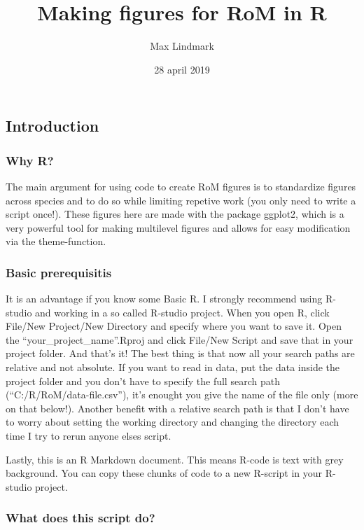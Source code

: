\documentclass[]{article}
\title{Making figures for RoM in R}
\author{Max Lindmark}
\date{28 april 2019}
\begin{document}
\maketitle

\subsection{Introduction}\label{introduction}

\subsubsection{Why R?}\label{why-r}

The main argument for using code to create RoM figures is to standardize
figures across species and to do so while limiting repetive work (you
only need to write a script once!). These figures here are made with the
package ggplot2, which is a very powerful tool for making multilevel
figures and allows for easy modification via the theme-function.

\subsubsection{Basic prerequisitis}\label{basic-prerequisitis}

It is an advantage if you know some Basic R. I strongly recommend using
R-studio and working in a so called R-studio project. When you open R,
click File/New Project/New Directory and specify where you want to save
it. Open the ``your\_project\_name''.Rproj and click File/New Script and
save that in your project folder. And that's it! The best thing is that
now all your search paths are relative and not absolute. If you want to
read in data, put the data inside the project folder and you don't have
to specify the full search path (``C:/R/RoM/data-file.csv''), it's
enought you give the name of the file only (more on that below!).
Another benefit with a relative search path is that I don't have to
worry about setting the working directory and changing the directory
each time I try to rerun anyone elses script.

Lastly, this is an R Markdown document. This means R-code is text with
grey background. You can copy these chunks of code to a new R-script in
your R-studio project.

\subsubsection{What does this script
do?}\label{what-does-this-script-do}
\end{document}

